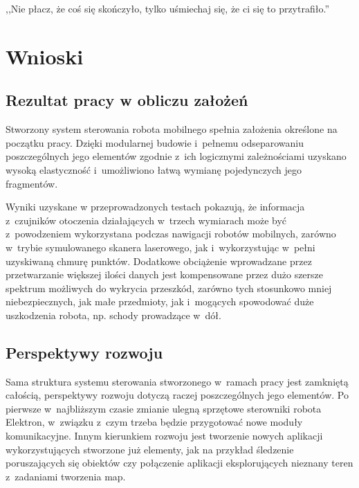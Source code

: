 

\begin{savequote}[70mm]
,,Nie płacz, że coś się skończyło, tylko uśmiechaj się, że ci się to przytrafiło.''
\end{savequote}


\chapter{Wnioski}
\label{chap:wnioski}

\section{Rezultat pracy w obliczu założeń}

Stworzony system sterowania robota mobilnego spełnia założenia określone na początku pracy.
Dzięki modularnej budowie i~pełnemu odseparowaniu poszczególnych jego elementów
zgodnie z~ich logicznymi zależnościami uzyskano wysoką elastyczność i~umożliwiono
łatwą wymianę pojedynczych jego fragmentów.

Wyniki uzyskane w przeprowadzonych testach pokazują, że informacja z~czujników otoczenia
działających w~trzech wymiarach może być z~powodzeniem wykorzystana podczas nawigacji
robotów mobilnych, zarówno w~trybie symulowanego skanera laserowego, jak i~wykorzystując
w~pełni uzyskiwaną chmurę punktów. Dodatkowe obciążenie wprowadzane przez przetwarzanie
większej ilości danych jest kompensowane przez dużo szersze spektrum możliwych do
wykrycia przeszkód, zarówno tych stosunkowo mniej niebezpiecznych, jak małe przedmioty,
jak i~mogących spowodować duże uszkodzenia robota, np. schody prowadzące w~dół.


\section{Perspektywy rozwoju}

Sama struktura systemu sterowania stworzonego w~ramach pracy jest zamkniętą całością,
perspektywy rozwoju dotyczą raczej poszczególnych jego elementów. Po pierwsze w~najbliższym
czasie zmianie ulegną sprzętowe sterowniki robota Elektron, w~związku z~czym trzeba będzie
przygotować nowe moduły komunikacyjne. Innym kierunkiem rozwoju jest tworzenie nowych
aplikacji wykorzystujących stworzone już elementy, jak na przykład śledzenie poruszających
się obiektów czy połączenie aplikacji eksplorujących nieznany teren z~zadaniami tworzenia
map.

